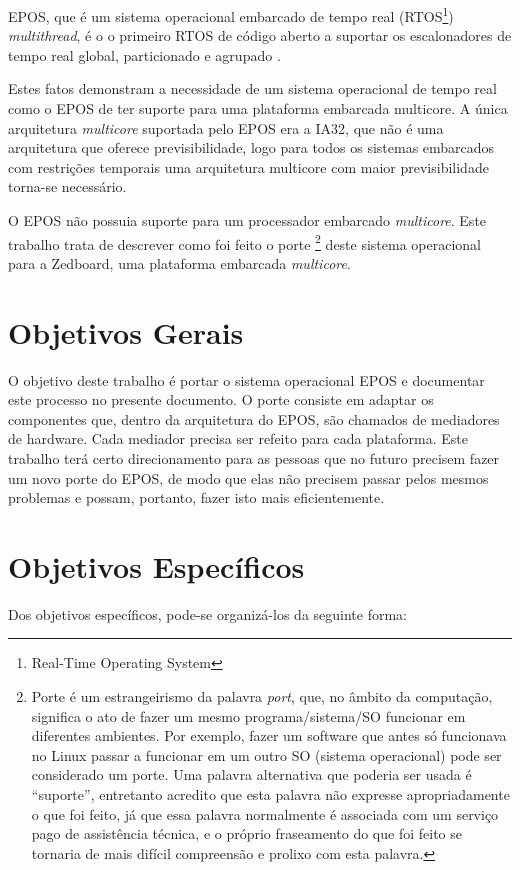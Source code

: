 EPOS, que é um sistema operacional embarcado de tempo real (RTOS\footnote{Real-Time Operating System}) \emph{multithread}, é o o primeiro RTOS de código aberto a suportar os escalonadores de tempo real global, particionado e agrupado \cite{gio}.


Estes fatos demonstram a necessidade de um sistema operacional de tempo real como o EPOS de ter suporte para uma plataforma embarcada multicore. A única arquitetura \emph{multicore} suportada pelo EPOS era a IA32, que não é uma arquitetura que oferece previsibilidade, logo para todos os sistemas embarcados com restrições temporais uma arquitetura multicore com maior previsibilidade torna-se necessário.

O EPOS não possuia suporte para um processador embarcado \emph{multicore}. 
Este trabalho trata de descrever como foi feito o porte
\footnote{Porte é um estrangeirismo da palavra \emph{port}, que, no âmbito da computação, significa o ato de fazer um mesmo programa/sistema/SO funcionar em diferentes ambientes. Por exemplo, fazer um software que antes só funcionava no Linux passar a funcionar em um outro SO (sistema operacional) pode ser considerado um porte. Uma palavra alternativa que poderia ser usada é ``suporte'', entretanto acredito que esta palavra não expresse apropriadamente o que foi feito, já que essa palavra normalmente é associada com um serviço pago de assistência técnica, e o próprio fraseamento do que foi feito se tornaria de mais difícil compreensão e prolixo com esta palavra.}
 deste sistema operacional para a Zedboard, uma plataforma embarcada \emph{multicore}.

\section{Objetivos Gerais}

O objetivo deste trabalho é portar o sistema operacional EPOS e documentar este processo no presente documento. O porte consiste em adaptar os componentes que, dentro da arquitetura do EPOS, são chamados de mediadores de hardware. Cada mediador precisa ser refeito para cada plataforma.
Este trabalho terá certo direcionamento para as pessoas que no futuro precisem fazer um novo porte do EPOS, de modo que elas não precisem passar pelos mesmos problemas e possam, portanto, fazer isto mais eficientemente.

\section{Objetivos Específicos}
Dos objetivos específicos, pode-se organizá-los da seguinte forma:

